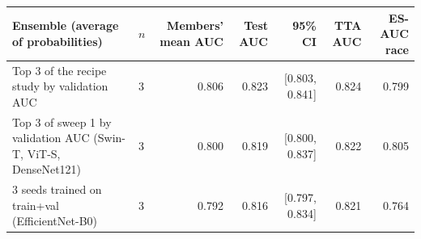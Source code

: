 \begin{tabular}{llrrrrr}
\toprule
Ensemble (average of probabilities) & $n$ & Members' mean AUC & Test AUC & 95\% CI & TTA AUC & ES-AUC race \\
\midrule
Top 3 of the recipe study by validation AUC & 3 & 0.806 & 0.823 & [0.803, 0.841] & 0.824 & 0.799 \\
Top 3 of sweep 1 by validation AUC (Swin-T, ViT-S, DenseNet121) & 3 & 0.800 & 0.819 & [0.800, 0.837] & 0.822 & 0.805 \\
3 seeds trained on train+val (EfficientNet-B0) & 3 & 0.792 & 0.816 & [0.797, 0.834] & 0.821 & 0.764 \\
\bottomrule
\end{tabular}
